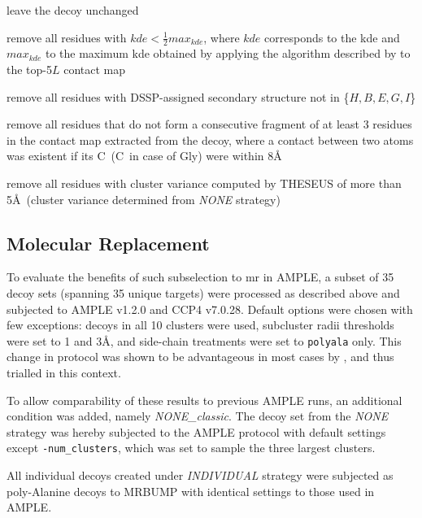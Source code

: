 \begin{description}[style=multiline,leftmargin=4cm]
    \item[default] leave the decoy unchanged
    \item[domain] remove all residues with $kde<\frac{1}{2}max_{kde}$, where $kde$ corresponds to the \gls{kde} and $max_{kde}$ to the maximum \gls{kde} obtained by applying the algorithm described by \textcite{Sadowski2013-zu} to the top-5$L$ contact map
    \item[dssp] remove all residues with DSSP-assigned secondary structure \cite{Frishman1995-si} not in \{$H, B, E, G, I$\}
    \item[fragment] remove all residues that do not form a consecutive fragment of at least 3 residues in the contact map extracted from the decoy, where a contact between two atoms was existent if its C\textbeta\ (C\textalpha\ in case of Gly) were within 8\AA
    \item[variance] remove all residues with cluster variance computed by THESEUS \cite{Theobald2006-qj} of more than 5\AA\ (cluster variance determined from \textit{NONE} strategy)
\end{description}

\subsection{Molecular Replacement} \label{subsec:ample_decoys_methods_mr}
To evaluate the benefits of such subselection to \gls{mr} in AMPLE, a subset of 35 decoy sets (spanning 35 unique targets) were processed as described above and subjected to AMPLE v1.2.0 and CCP4 v7.0.28. Default options were chosen with few exceptions: decoys in all 10 clusters were used, subcluster radii thresholds were set to 1 and 3\AA, and side-chain treatments were set to \texttt{polyala} only. This change in protocol was shown to be advantageous in most cases by \textcite{Thomas2017-qu}, and thus trialled in this context. 

To allow comparability of these results to previous AMPLE runs, an additional condition was added, namely \textit{NONE\_classic}. The decoy set from the \textit{NONE} strategy was hereby subjected to the AMPLE protocol with default settings except \texttt{-num\_clusters}, which was set to sample the three largest clusters.

All individual decoys created under \textit{INDIVIDUAL} strategy were subjected as poly-Alanine decoys to MRBUMP \cite{Keegan2018-kn} with identical settings to those used in AMPLE. 

